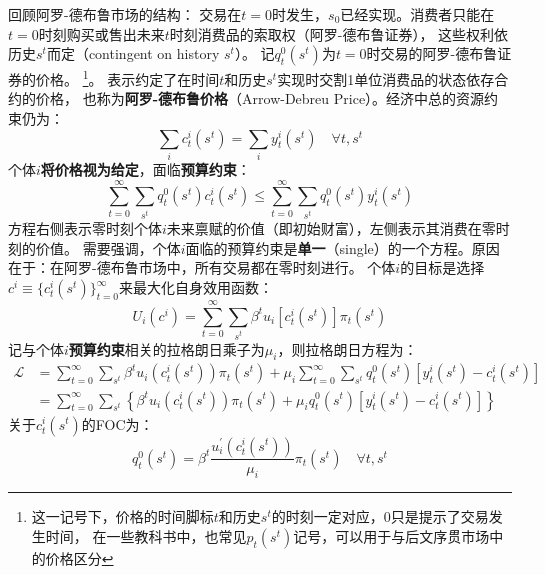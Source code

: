 回顾阿罗-德布鲁市场的结构：
交易在$t=0$时发生，$s_0$已经实现。消费者只能在$t=0$时刻购买或售出未来$t$时刻消费品的索取权（阿罗-德布鲁证券），
这些权利依历史$s^t$而定（contingent on history $s^t$）。
记$q_t^0\left(s^t\right)$为$t=0$时交易的阿罗-德布鲁证券的价格。
\footnote{这一记号下，价格的时间脚标$t$和历史$s^t$的时刻一定对应，$0$只是提示了交易发生时间，
在一些教科书中，也常见$p_t\left(s^t\right)$记号，可以用于与后文序贯市场中的价格区分}。
表示约定了在时间$t$和历史$s^t$实现时交割1单位消费品的状态依存合约的价格，
也称为\textbf{阿罗-德布鲁价格}（Arrow-Debreu Price）。经济中总的资源约束仍为：
\begin{equation}    \label{eq-ad-rc}
    \sum_i c_t^i\left(s^t\right) = \sum_i y_t^i\left(s^t\right) \quad \forall  t, s^t
\end{equation}
个体$i$\textbf{将价格视为给定}，面临\textbf{预算约束}：
\begin{equation}    \label{eq-ad-bc}
    \sum_{t=0}^{\infty} \sum_{s^t} q_t^0\left(s^t\right) c_t^i\left(s^t\right) 
        \leq \sum_{t=0}^{\infty} \sum_{s^t} q_t^0\left(s^t\right) y_t^i\left(s^t\right)
\end{equation}
方程右侧表示零时刻个体$i$未来禀赋的价值（即初始财富），左侧表示其消费在零时刻的价值。
需要强调，个体$i$面临的预算约束是\textbf{单一}（single）的一个方程。原因在于：在阿罗-德布鲁市场中，所有交易都在零时刻进行。
个体$i$的目标是选择$c^i\equiv \{c_t^i\left(s^t\right)\}_{t=0}^{\infty}$来最大化自身效用函数：
\begin{equation}    \label{eq-ad-preference-i}
    U_i\left(c^i\right)=\sum_{t=0}^{\infty} \sum_{s^t} \beta^t u_i\left[c_t^i\left(s^t\right)\right] \pi_t\left(s^t\right)
\end{equation}
记与个体$i$\textbf{预算约束}相关的拉格朗日乘子为$\mu_i$，则拉格朗日方程为：
\begin{equation*}
    \begin{aligned}
        \mathcal{L} &=\sum_{t=0}^{\infty} \sum_{s^t} \beta^t u_i\left(c_t^i\left(s^t\right)\right) \pi_t\left(s^t\right) 
            +\mu_i \sum_{t=0}^{\infty} \sum_{s^t} q_t^0\left(s^t\right)\left[y_t^i\left(s^t\right)-c_t^i\left(s^t\right)\right] \\
            &= \sum_{t=0}^{\infty} \sum_{s^t}\left\{\beta^t u_i\left(c_t^i\left(s^t\right)\right) \pi_t\left(s^t\right)
                +\mu_i q_t^0\left(s^t\right)\left[y_t^i\left(s^t\right)-c_t^i\left(s^t\right)\right]\right\}
    \end{aligned}
\end{equation*}
关于$c_t^i\left(s^t\right)$的FOC为：
\begin{equation}    \label{eq-ad-foc}
    q_t^0\left(s^t\right) = \beta^t \frac{u_i^{\prime}\left(c_t^i\left(s^t\right)\right)}{\mu_i} \pi_t\left(s^t\right)
    \quad \forall t, s^t
\end{equation}

